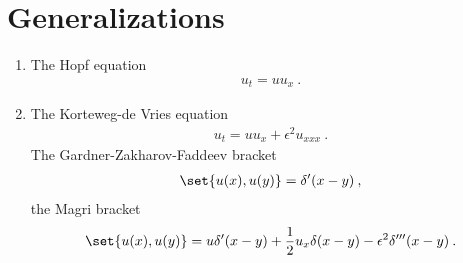\chapter{Generalizations}

\begin{example}
    \begin{enumerate}
        \item The Hopf equation
        \begin{align}
            u_t = u u_x \:.
        \end{align}

        \item The Korteweg-de Vries equation
        \begin{align}
            u_t = u u_x + \epsilon^2 u_{xxx} \:.
        \end{align}
        The Gardner-Zakharov-Faddeev bracket
        \begin{align}
            \set{u(x),u(y)} = \delta'(x-y) \:,
        \end{align}
        the Magri bracket
        \begin{align}
            \set{u(x),u(y)} = u \delta' (x-y) + \frac{1}{2} u_x \delta(x-y) - \epsilon^2 \delta'''(x-y) \:.
        \end{align}
    \end{enumerate}
\end{example}